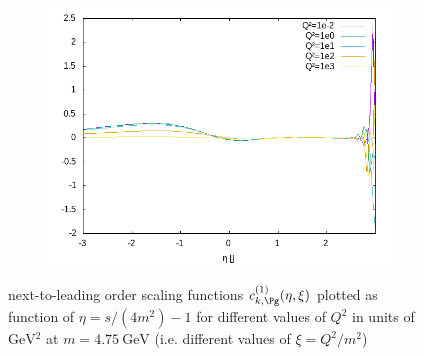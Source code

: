 \begin{figure}[ht!]
\begin{subfigure}[t]{.3\textwidth}
\end{subfigure}%
\begin{subfigure}[t]{.3\textwidth}
	\includegraphics[width=\textwidth]{../../img2/partonic/cg1_AA_x2g1}
\end{subfigure}%
\caption{next-to-leading order scaling functions $c_{k,\Pg}^{(1)}(\eta,\xi)$ plotted as function of $\eta=s/(4m^2)-1$ for different values of $Q^2$ in units of $\si{\GeV^2}$ at $m=\SI{4.75}{\GeV}$ (i.e. different values of $\xi=Q^2/m^2$) }\label{fig:cg1}
\end{figure}

